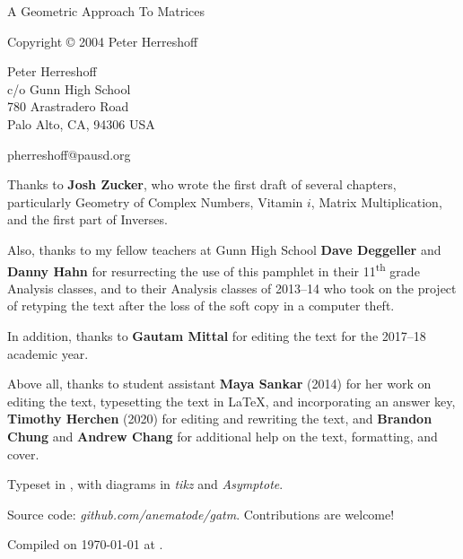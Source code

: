 \documentclass[../gatm.tex]{subfiles}
\begin{document}
\newcommand\dnew{\vspace{1cm}}

\begin{center}
	\vspace*{\fill}

	\doublespacing
	A Geometric Approach To Matrices

	Copyright \copyright{} 2004 Peter Herreshoff  %

	\vspace{1cm}

	Peter Herreshoff\\
	c/o Gunn High School\\
	780 Arastradero Road\\
	Palo Alto, CA, 94306 USA

	\vspace{.5cm}

	pherreshoff@pausd.org %

	\vspace{1cm}
\end{center}

\noindent Thanks to \textbf{Josh Zucker}, who wrote the first draft of several chapters, particularly Geometry of Complex Numbers, Vitamin $i$, Matrix Multiplication, and the first part of Inverses.

\noindent Also, thanks to my fellow teachers at Gunn High School \textbf{Dave Deggeller} and \textbf{Danny Hahn} for resurrecting the use of this pamphlet in their 11\textsuperscript{th} grade Analysis classes, and to their Analysis classes of 2013--14 who took on the project of retyping the text after the loss of the soft copy in a computer theft.

\noindent In addition, thanks to \textbf{Gautam Mittal} for editing the text for the 2017--18 academic year.

Above all, thanks to student assistant \textbf{Maya Sankar} (2014) for her work on editing the text, typesetting the text in \LaTeX{}, and incorporating an answer key, \textbf{Timothy Herchen} (2020) for editing and rewriting the text, and \textbf{Brandon Chung} and \textbf{Andrew Chang} for additional help on the text, formatting, and cover.

\vspace{0.5cm}

\noindent Typeset in \LaTeXe, with diagrams in \textit{tikz} and \textit{Asymptote}.

\noindent Source code: \textit{github.com/anematode/gatm}. Contributions are welcome!

\noindent Compiled on {\ddmmyyyydate\today} at \currenttime.

\vspace*{\fill}
\end{document}
